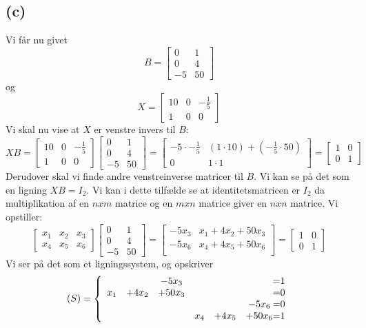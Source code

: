 \documentclass[a4paper,fleqn]{article}
\begin{document}
	\subsection{(c)}
	Vi får nu givet \[B = \begin{bmatrix}0&1\\0&4\\-5&50\end{bmatrix}\] og
	\[X = \begin{bmatrix}10&0&-\frac{1}{5}\\1&0&0\end{bmatrix}\]
	Vi skal nu vise at $X$ er venstre invers til $B$:
	\[XB = \begin{bmatrix}10&0&-\frac{1}{5}\\1&0&0\end{bmatrix} \begin{bmatrix}0&1\\0&4\\-5&50\end{bmatrix}
		= \begin{bmatrix}
			-5\cdot -\frac{1}{5} & (1\cdot 10) + (-\frac{1}{5}\cdot 50) \\
			0 & 1\cdot 1
		\end{bmatrix} = \begin{bmatrix}1&0\\0&1\end{bmatrix}
	\]
	Derudover skal vi finde andre venstreinverse matricer til $B$. Vi kan se på det som en
	ligning $XB = I_{2}$. Vi kan i dette tilfælde se at identitetsmatricen er $I_2$ da
	multiplikation af en $n x m$ matrice og en $m x n$ matrice giver en $n x n$ matrice. Vi
	opstiller:
	\[\begin{bmatrix}x_1 & x_2 & x_3 \\ x_4 & x_5 & x_6\end{bmatrix}
	\begin{bmatrix}0&1\\0&4\\-5&50\end{bmatrix} =
	\begin{bmatrix}
		-5x_3 	& x_1+4x_2+50x_3	\\
		-5x_6 	& x_4 + 4x_5 + 50x_6 \\
	\end{bmatrix} = 
	\begin{bmatrix}1&0\\0&1\end{bmatrix} \]
	Vi ser på det som et ligningssystem, og opskriver
	\[ (S) = \left\{ \begin{array}{cccccc @{= } l}
		&&-5x_3 & & & & 1\\
		x_1& +4x_2&+50x_3 &&&& 0\\
		   &&&&&-5x_6&0\\
		   &&&x_4&+4x_5&+50x_6&1
	\end{array}\right. \]
\end{document}
